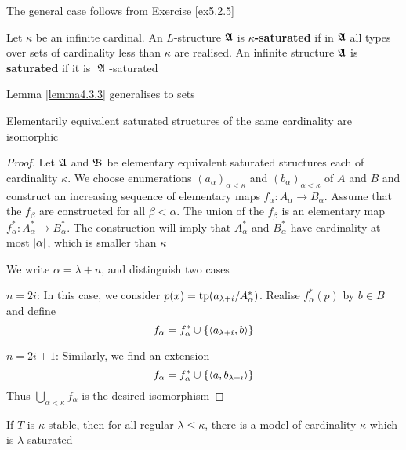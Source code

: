 \documentclass[11pt]{article}
\begin{document}
The general case follows from Exercise \ref{ex5.2.5}

\begin{definition}[]
Let \(\kappa\) be an infinite cardinal. An \(L\)-structure \(\mathfrak{A}\) is \textbf{\(\kappa\)-saturated} if in \(\mathfrak{A}\) all
types over sets of cardinality less than \(\kappa\) are realised. An infinite structure \(\mathfrak{A}\) is \textbf{saturated}
if it is \(\abs{\fA}\)-saturated
\end{definition}

Lemma \ref{lemma4.3.3} generalises to sets

\begin{lemma}[]
\label{lemma5.2.8}
Elementarily equivalent saturated structures of the same cardinality are isomorphic
\end{lemma}

\begin{proof}
Let \(\mathfrak{A}\) and \(\mathfrak{B}\) be elementary equivalent saturated structures each of cardinality \(\kappa\). We
choose enumerations \((a_\alpha)_{\alpha<\kappa}\) and \((b_\alpha)_{\alpha<\kappa}\) of \(A\) and \(B\) and construct an
increasing sequence of elementary maps \(f_\alpha:A_\alpha\to B_\alpha\). Assume that the \(f_\beta\) are constructed
for all \(\beta<\alpha\). The union of the \(f_\beta\) is an elementary map \(f_\alpha^*:A_\alpha^*\to B_\alpha^*\). The
construction will imply that \(A_\alpha^*\) and \(B_\alpha^*\) have cardinality at most \(\abs{\alpha}\), which
is smaller than \(\kappa\)

We write \(\alpha=\lambda+n\), and distinguish two cases

\(n=2i\): In this case, we consider \(p(x)=\operatorname{tp}(a_{\lambda+i}/A_\alpha^*)\). Realise \(f_\alpha^*(p)\) by \(b\in B\)
and define
\begin{equation*}
f_\alpha=f_\alpha^*\cup\{\langle a_{\lambda+i},b\rangle\}
\end{equation*}

\(n=2i+1\): Similarly, we find an extension
\begin{equation*}
f_\alpha=f_\alpha^*\cup\{\langle a,b_{\lambda+i}\rangle\}
\end{equation*}
Thus \(\bigcup_{\alpha<\kappa}f_\alpha\) is the desired isomorphism
\end{proof}

\begin{lemma}[]
\label{lemma5.2.9}
If \(T\) is \(\kappa\)-stable, then for all regular \(\lambda\le\kappa\), there is a model of cardinality \(\kappa\) which is \(\lambda\)-saturated
\end{lemma}
\end{document}
